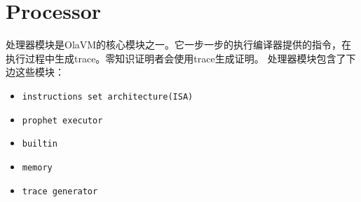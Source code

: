 \section{Processor}\label{sec: processor}
处理器模块是OlaVM的核心模块之一。它一步一步的执行编译器提供的指令，在执行过程中生成trace。零知识证明者会使用trace生成证明。
处理器模块包含了下边这些模块：
\begin{itemize}
    \item \verb|instructions set architecture(ISA)|
    \item \verb|prophet executor|
    \item \verb|builtin|
    \item \verb|memory|
    \item \verb|trace generator|
\end{itemize}






%